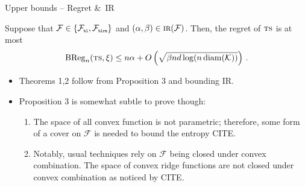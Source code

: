 \documentclass{beamer}
\newcommand{\BReg}{\operatorname{BReg}}
\newcommand{\diam}{\operatorname{diam}}
\newcommand{\cK}{\mathcal{K}}
\newcommand{\cF}{\mathcal{F}}
\newcommand{\ts}{{\textsc{ts}}}
\newcommand{\pr}{\text{\tiny\texttt{r}}}
\newcommand{\pb}{\text{\tiny\texttt{b}}}
\newcommand{\pl}{\text{\tiny\texttt{l}}}
\renewcommand{\pm}{\text{\tiny\texttt{m}}}
\newcommand{\IR}{\operatorname{\textsc{ir}}}
\begin{document}
\begin{frame}{Upper bounds -- Regret \&\ IR}
    \small
    \begin{tcolorbox}[title=Proposition 3 -- IR regret bound,colback=blue!5!white,colframe=blue!50!black]
        Suppose that $\cF \in \{\cF_{\pb\pl}, \cF_{\pb\pl\pr\pm}\}$ and $(\alpha, \beta) \in \IR(\cF)$.
        Then, the regret of $\ts$ is at most
        \begin{align*}
            \BReg_n(\ts, \xi) \leq n \alpha + O\left(\sqrt{\beta n d \log(n \diam(\cK))}\right) \,.
        \end{align*}
    \end{tcolorbox}
    \begin{itemize}
        \item Theorems 1,2 follow from Proposition 3 and bounding IR.
        \item Proposition 3 is somewhat subtle to prove though:
              \begin{enumerate}
                  \item The space of all convex function is not parametric; therefore, some form of a cover on $\cF$ is needed to bound the entropy CITE.
                  \item Notably, usual techniques rely on $\cF$ being closed under convex combination. The space of convex ridge functions are not closed under convex combination as noticed by CITE.
              \end{enumerate}
    \end{itemize}
\end{frame}
\end{document}
